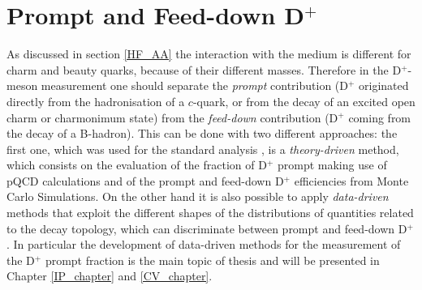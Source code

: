 \documentclass[b5paper,10pt,twoside,oldstyle,classica]{toptesi}
\begin{document}
\section{Prompt and Feed-down D$^+$}
As discussed in section \ref{HF_AA} the interaction with the medium is different for charm and beauty quarks, because of their different masses. Therefore in the D$^+$-meson measurement one should separate the \textit{prompt} contribution (D$^+$ originated directly from the hadronisation of a $c$-quark, or from the decay of an excited open charm or charmonimum state) from the \textit{feed-down} contribution (D$^+$ coming from the decay of a B-hadron). This can be done with two different approaches: the first one, which was used for the standard analysis \cite{Abelev:2014hha}, is a \textit{theory-driven} method, which consists on the evaluation of the fraction of D$^+$ prompt making use of pQCD calculations and of the prompt and feed-down D$^+$ efficiencies from Monte Carlo Simulations. On the other hand it is also possible to apply \textit{data-driven} methods that exploit the different shapes of the distributions of quantities related to the decay topology, which can discriminate between prompt and feed-down D$^+$. In particular the development of data-driven methods for the measurement of the D$^+$ prompt fraction is the main topic of thesis and will be presented in Chapter \ref{IP_chapter} and \ref{CV_chapter}.   
\end{document}
